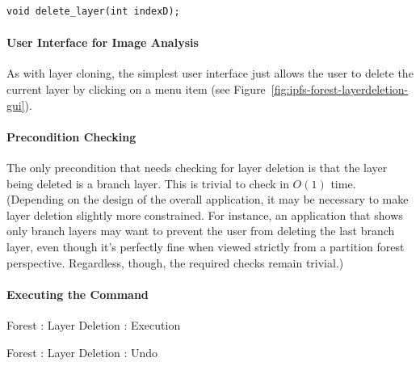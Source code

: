 \begin{lstlisting}[style=Prototype]
void delete_layer(int indexD);
\end{lstlisting}

\paragraph{User Interface for Image Analysis}

As with layer cloning, the simplest user interface just allows the user to delete the current layer by clicking on a menu item (see Figure~\ref{fig:ipfs-forest-layerdeletion-gui}).


\paragraph{Precondition Checking}

The only precondition that needs checking for layer deletion is that the layer being deleted is a branch layer. This is trivial to check in $O(1)$ time. (Depending on the design of the overall application, it may be necessary to make layer deletion slightly more constrained. For instance, an application that shows only branch layers may want to prevent the user from deleting the last branch layer, even though it's perfectly fine when viewed strictly from a partition forest perspective. Regardless, though, the required checks remain trivial.)

\paragraph{Executing the Command}

\begin{stulisting}[p]
\caption{Forest : Layer Deletion : Execution}
\label{code:ipfs-forest-deletelayerimpl}

\end{stulisting}

\begin{stulisting}[p]
\caption{Forest : Layer Deletion : Undo}
\label{code:ipfs-forest-undeletelayerimpl}

\end{stulisting}

